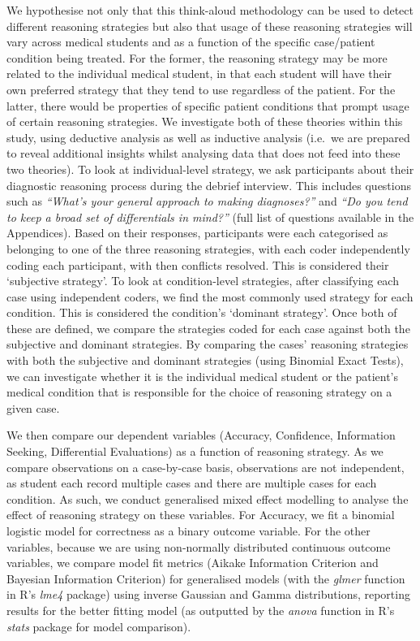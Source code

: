 \documentclass[a4paper, nobind]{templates/ociamthesis}
\begin{document}
We hypothesise not only that this think-aloud methodology can be used to detect different reasoning strategies but also that usage of these reasoning strategies will vary across medical students and as a function of the specific case/patient condition being treated. For the former, the reasoning strategy may be more related to the individual medical student, in that each student will have their own preferred strategy that they tend to use regardless of the patient. For the latter, there would be properties of specific patient conditions that prompt usage of certain reasoning strategies. We investigate both of these theories within this study, using deductive analysis as well as inductive analysis (i.e.~we are prepared to reveal additional insights whilst analysing data that does not feed into these two theories). To look at individual-level strategy, we ask participants about their diagnostic reasoning process during the debrief interview. This includes questions such as \emph{``What's your general approach to making diagnoses?''} and \emph{``Do you tend to keep a broad set of differentials in mind?''} (full list of questions available in the Appendices). Based on their responses, participants were each categorised as belonging to one of the three reasoning strategies, with each coder independently coding each participant, with then conflicts resolved. This is considered their `subjective strategy'. To look at condition-level strategies, after classifying each case using independent coders, we find the most commonly used strategy for each condition. This is considered the condition's `dominant strategy'. Once both of these are defined, we compare the strategies coded for each case against both the subjective and dominant strategies. By comparing the cases' reasoning strategies with both the subjective and dominant strategies (using Binomial Exact Tests), we can investigate whether it is the individual medical student or the patient's medical condition that is responsible for the choice of reasoning strategy on a given case.

\hfill\break
We then compare our dependent variables (Accuracy, Confidence, Information Seeking, Differential Evaluations) as a function of reasoning strategy. As we compare observations on a case-by-case basis, observations are not independent, as student each record multiple cases and there are multiple cases for each condition. As such, we conduct generalised mixed effect modelling to analyse the effect of reasoning strategy on these variables. For Accuracy, we fit a binomial logistic model for correctness as a binary outcome variable. For the other variables, because we are using non-normally distributed continuous outcome variables, we compare model fit metrics (Aikake Information Criterion and Bayesian Information Criterion) for generalised models (with the \emph{glmer} function in R's \emph{lme4} package) using inverse Gaussian and Gamma distributions, reporting results for the better fitting model (as outputted by the \emph{anova} function in R's \emph{stats} package for model comparison).
\end{document}
